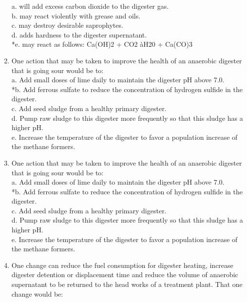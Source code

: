 \documentclass{article}
\begin{document}
\begin{enumerate}
a. will add excess carbon dioxide to the digester gas. \\
b. may react violently with grease and oils. \\
c. may destroy desirable saprophytes. \\
d. adds hardness to the digester supernatant. \\
*e. may react as follows: Ca(OH)2 + CO2
àH20 + Ca(CO)3 \\

\item  One action that may be taken to improve the health of an anaerobic digester that is going sour would be to: \\

a. Add small doses of lime daily to maintain the digester pH above 7.0. \\
*b. Add ferrous sulfate to reduce the concentration of hydrogen sulfide in the digester. \\
c. Add seed sludge from a healthy primary digester. \\
d. Pump raw sludge to this digester more frequently so that this sludge has a higher pH. \\
e. Increase the temperature of the digester to favor a population increase of the methane formers. \\

\item  One action that may be taken to improve the health of an anaerobic digester that is going sour would be to: \\

a. Add small doses of lime daily to maintain the digester pH above 7.0. \\
*b. Add ferrous sulfate to reduce the concentration of hydrogen sulfide in the digester. \\
c. Add seed sludge from a healthy primary digester. \\
d. Pump raw sludge to this digester more frequently so that this sludge has a higher pH. \\
e. Increase the temperature of the digester to favor a population increase of the methane formers. \\

\item  One change can reduce the fuel consumption for digester heating, increase digester detention or displacement time and reduce the volume of anaerobic supernatant to be returned to the head works of a treatment plant. That one change would be: \\


\end{enumerate}
\end{document}
